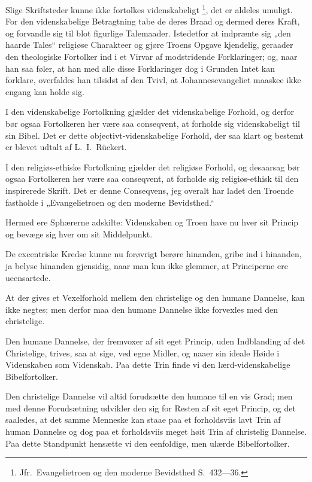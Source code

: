 \documentclass[12pt,a4paper]{book}
\newcommand{\opage}[1]{\marginnote{\footnotesize\textit{[#1]}}}
\begin{document}
Slige Skriftsteder kunne ikke fortolkes videnskabeligt%
\footnote{Jfr.\ Evangelietroen og den moderne Bevidsthed S.\ 432---36.},
det er aldeles umuligt. For den videnskabelige Betragtning tabe de deres
Braad og dermed deres Kraft, og forvandle sig til blot figurlige
Talemaader. Istedetfor at indprænte sig „den haarde Tales“ religiøse
Charakteer og gjøre Troens Opgave kjendelig, geraader den theologiske
Fortolker ind i et Virvar af modstridende Forklaringer; og, naar han saa
føler, at han med alle disse Forklaringer dog i Grunden Intet kan
forklare, overfaldes han tilsidst af den Tvivl, at Johannesevangeliet
maaskee ikke engang kan holde sig.

I den videnskabelige Fortolkning gjælder det videnskabelige Forhold, og
derfor bør ogsaa Fortolkeren her være saa conseqvent, at forholde sig
videnskabeligt til sin Bibel. Det er dette objectivt-videnskabelige
Forhold, der saa klart og bestemt er blevet udtalt af L.\ I.\ Rückert.

I den religiøs-ethiske Fortolkning gjælder det religiøse Forhold, og
desaarsag bør ogsaa Fortolkeren her være saa conseqvent,
\opage{64} at forholde sig religiøs-ethisk til den inspirerede Skrift. Det er denne
Conseqvens, jeg overalt har ladet den Troende fastholde i
„Evangelietroen og den moderne Bevidsthed.“

Hermed ere Sphærerne adskilte: Videnskaben og Troen have nu hver sit
Princip og bevæge sig hver om sit Middelpunkt.

De excentriske Kredse kunne nu forøvrigt berøre hinanden, gribe ind i
hinanden, ja belyse hinanden gjensidig, naar man kun ikke glemmer, at
Principerne ere ueensartede.

At der gives et Vexelforhold mellem den christelige og den humane
Dannelse, kan ikke negtes; men derfor maa den humane Dannelse ikke
forvexles med den christelige.

Den humane Dannelse, der fremvoxer af sit eget Princip, uden Indblanding
af det Christelige, trives, saa at sige, ved egne Midler, og naaer sin
ideale Høide i Videnskaben som Videnskab. Paa dette Trin finde vi den
lærd-videnskabelige Bibelfortolker.

Den christelige Dannelse vil altid forudsætte den humane til en vis Grad;
men med denne Forudsætning udvikler den sig for Resten af sit eget
Princip, og det saaledes, at det samme Menneske kan staae paa et
forholdsviis lavt Trin af human Dannelse og dog paa et forholdsviis meget
høit Trin af christelig Dannelse. Paa dette Standpunkt hensætte vi den
eenfoldige, men ulærde Bibelfortolker.
\end{document}
